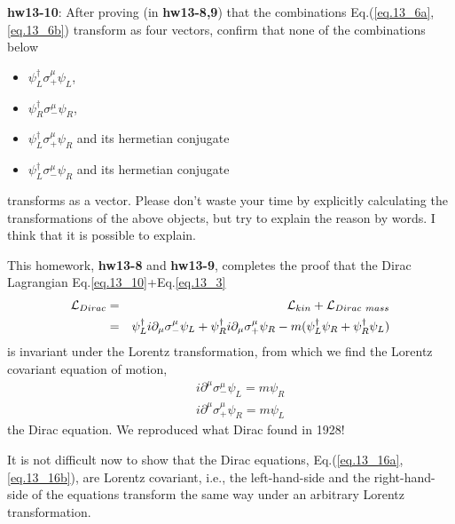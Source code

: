 \documentclass[12pt]{article}
\def\del{{\partial}}
\begin{document}
{\bf hw13-10}: After proving (in {\bf hw13-8,9}) that the combinations Eq.(\ref{eq.13_6a},\ref{eq.13_6b}) transform as four vectors, confirm that none of the combinations below
\begin{itemize}
  \item $\psi_L^\dagger \sigma_+^\mu \psi_L$,
  \item $\psi_R^\dagger \sigma_-^\mu \psi_R$,
  \item $\psi_L^\dagger \sigma_+^\mu \psi_R$ and its hermetian conjugate
  \item $\psi_L^\dagger \sigma_-^\mu \psi_R$ and its hermetian conjugate
\end{itemize}
  transforms as a vector. Please don't waste your time by explicitly
  calculating the transformations of the above objects, but try to
  explain the reason by words.  I think that it is possible to explain.

  This homework, {\bf hw13-8} and {\bf hw13-9}, completes the proof that the Dirac
  Lagrangian Eq.\ref{eq.13_10}+Eq.\ref{eq.13_3}
\begin{eqnarray}
  {\cal L}_{Dirac}
  &=& {\cal L}_{kin} + {\cal L}_{Dirac~mass} \\
  &=& \psi_L^\dagger i\del_\mu \sigma_-^\mu \psi_L 
  + \psi_R^\dagger i\del_\mu \sigma_+^\mu \psi_R
  -m (\psi_L^\dagger \psi_R + \psi_R^\dagger \psi_L) \label{eq.13_15}
\end{eqnarray}
  is invariant under the Lorentz transformation, from which we find
  the Lorentz covariant equation of motion,
\begin{eqnarray}
  &&i\del^\mu \sigma_-^\mu \psi_L = m \psi_R \label{eq.13_16a}\\
  && i\del^\mu \sigma_+^\mu \psi_R = m \psi_L\label{eq.13_16b}
\end{eqnarray}
the Dirac equation.  We reproduced what Dirac found in 1928!

It is not difficult now to show that the Dirac equations, Eq.(\ref{eq.13_16a}, \ref{eq.13_16b}), are Lorentz covariant, i.e., the left-hand-side and the
  right-hand-side of the equations transform the same way under an
  arbitrary Lorentz transformation.
\end{document}
